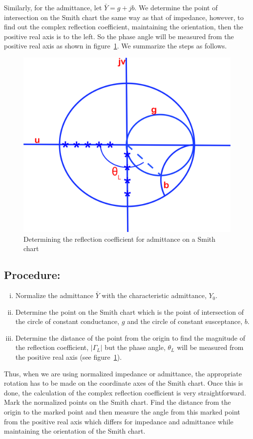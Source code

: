 Similarly, for the admittance, let $\bar{Y} = g + jb$. We determine the point of intersection on the Smith chart the same way as that of impedance, however, to find out the complex reflection coefficient, maintaining the orientation, then the positive real axis is to the left. So the phase angle will be measured from the positive real axis as shown in figure~\ref{fig:kjhgfds}. We summarize the steps as follows.
\begin{figure}[h]
\centering
\includegraphics[width=0.7\linewidth]{graphics/KJHGFDS}
\caption{Determining the reflection coefficient for admittance on a Smith chart}
\label{fig:kjhgfds}
\end{figure}

\subsection*{Procedure:}
\begin{enumerate}[(i)]
\item Normalize the admittance $\bar{Y}$ with the characteristic admittance, $Y_0$.
\item Determine the point on the Smith chart which is the point of intersection of the circle of constant conductance, $g$ and the circle of constant susceptance, $b$.
\item Determine the distance of the point from the origin to find the magnitude of the reflection coefficient, $|\Gamma_L|$ but the phase angle, $\theta_L$ will be measured from the positive real axis (see figure~\ref{fig:kjhgfds}). 
\end{enumerate}

Thus, when we are using normalized impedance or admittance, the appropriate rotation has to be made on the coordinate axes of the Smith chart. Once this is done, the calculation of the complex reflection coefficient is very straightforward. Mark the normalized points on the Smith chart. Find the distance from the origin to the marked point and then measure the angle from this marked point from the positive real axis which differs for impedance and admittance while maintaining the orientation of the Smith chart. 

